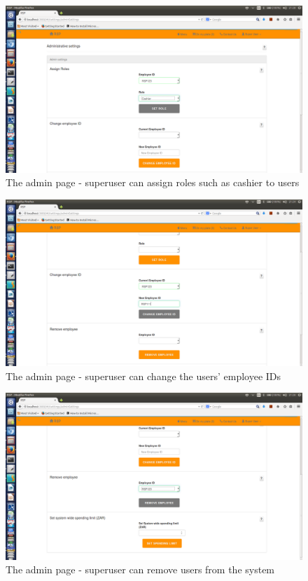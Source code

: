 \documentclass[a4paper,12pt]{article}
\begin{document}
\begin{figure}[H]
  \centering
    \includegraphics[width=1.0\textwidth]{screenshots/assignRole.png}
    \caption{The admin page - superuser can assign roles such as cashier to users} 
\end{figure}

\begin{figure}[H]
  \centering
    \includegraphics[width=1.0\textwidth]{screenshots/changeEmplid.png}
    \caption{The admin page - superuser can change the users' employee IDs} 
\end{figure}

\begin{figure}[H]
  \centering
    \includegraphics[width=1.0\textwidth]{screenshots/removeUser.png}
    \caption{The admin page - superuser can remove users from the system} 
\end{figure}
\end{document}
